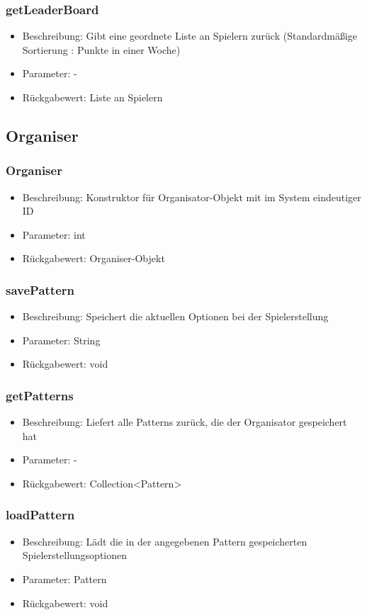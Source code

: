 \documentclass[a4paper]{scrreprt}
\begin{document}
	\subsubsection{getLeaderBoard}
	\begin{itemize}
		\item Beschreibung: Gibt eine geordnete Liste an Spielern zurück (Standardmäßige Sortierung : Punkte in einer Woche)
		\item Parameter: -
		\item Rückgabewert: Liste an Spielern
	\end{itemize}

	\subsection{Organiser}
	\subsubsection{Organiser}
	\begin{itemize}
		\item Beschreibung: Konstruktor für Organisator-Objekt mit im System eindeutiger ID
		\item Parameter: int
		\item Rückgabewert: Organiser-Objekt
	\end{itemize}
	\subsubsection{savePattern}
	\begin{itemize}
		\item Beschreibung: Speichert die aktuellen Optionen bei der Spielerstellung
		\item Parameter: String
		\item Rückgabewert: void
	\end{itemize}
	\subsubsection{getPatterns}
	\begin{itemize}
		\item Beschreibung: Liefert alle Patterns zurück, die der Organisator gespeichert hat
		\item Parameter: -
		\item Rückgabewert: Collection<Pattern>
	\end{itemize}
	\subsubsection{loadPattern}
	\begin{itemize}
		\item Beschreibung: Lädt die in der angegebenen Pattern gespeicherten Spielerstellungsoptionen
		\item Parameter: Pattern
		\item Rückgabewert: void
	\end{itemize}
\end{document}
